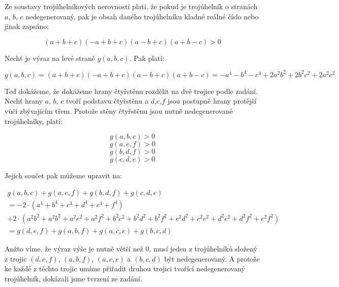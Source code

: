 \documentclass{fkssolpub}
\author{Ondřej Sedláček}
\begin{document}
Ze soustavy trojúhelníkových nerovností platí, že pokud je trojúhelník o stranách $a$, $b$, $c$ nedegenerovaný, pak je obsah daného trojúhelníku kladné reálné číslo nebo jinak zapsáno:

\[
	(a + b + c)(- a + b + c)(a - b + c)(a + b - c) > 0
\]

Nechť je výraz na levé straně $g(a, b, c)$. Pak platí:

\[
	g(a, b, c) = (a + b + c)(- a + b + c)(a - b + c)(a + b - c) = -a^4 - b^4 -c^4 + 2a^2 b^2 + 2b^2 c^2 + 2a^2 c^2
\]

Teď dokážeme, že dokážeme hrany čtyřstěnu rozdělit na dvě trojice podle zadání. Nechť hrany $a$, $b$, $c$ tvoří podstavu čtyřstěnu a $d$,$e$,$f$ jsou postupně hrany protější vůči zbývajícím třem. Protože stěny čtyřstěnu jsou nutně nedegenerované trojúhelníky, platí:

\[
	g(a,b,c) > 0
\]
\[
	g(a,e,f) > 0
\]
\[
	g(b,d,f) > 0
\]
\[
	g(c,d,e) > 0
\]

Jejich součet pak můžeme upravit na:

\begin{gather*}
	g(a,b,c) + g(a,e,f) + g(b,d,f) + g(c,d,e) \\
	= -2 \cdot (a^4 + b^4 + c^4 + d^4 + e^4 +f^4) \\
	+ 2 \cdot (a^2 b^2 + a^2 b^2 + a^2 e^2 + a^2 f^2+b^2 c^2 + b^2 d^2 + b^2 f^2 + c^2 d^2 + c^2 e^2 + d^2 e^2 + d^2 f^2 + e^2 f^2 ) \\
	= g(d,e,f) + g(a, b, f) + g(a,c,e) + g(b,c,d)
\end{gather*}

Anžto víme, že výraz výše je nutně větší než 0, musí jeden z trojúhelníků složený z trojic $(d,e,f)$, $(a,b,f)$, $(a,c,e)$ a $(b,c,d)$ být nedegenerovaný. A protože ke každé z těchto trojic umíme přiřadit druhou trojici tvořící nedegenerovaný trojúhelník, dokázali jsme tvrzení ze zadání.
\end{document}
